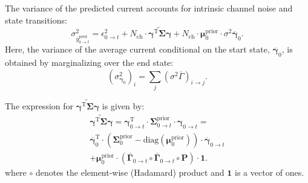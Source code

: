 \documentclass[pdflatex,sn-mathphys-num]{sn-jnl}%
\theoremstyle{thmstyleone}%
\theoremstyle{thmstyletwo}%
\theoremstyle{thmstylethree}%
\begin{document}
The variance of the predicted current accounts for intrinsic channel noise and state transitions:
\begin{equation}
	\sigma^2_{\overline{y}^{\text{pred}}_{0 \rightarrow t}} = \epsilon^2_{0 \rightarrow t} + N_{\text{ch}} \cdot \widetilde{\mathbf{\gamma}^{\mathrm{T}} \mathbf{\Sigma}\mathbf{\gamma}} + 
	N_{\text{ch}} \cdot \mathbf{\mu}^{\mathrm{prior}}_{0} \cdot {\sigma^2 \overline{\mathbf{\gamma}}}_{0}.
	\label{eq:macro_interval_sigma_pred}
\end{equation}
Here, the variance of the average current conditional on the start state, \( \overline{\mathbf{\gamma}}_{0} \), is obtained by marginalizing over the end state:
\begin{equation}
	(\sigma^2_{\overline{\mathbf{\gamma}}_{0}})_i = \sum_j (\sigma^2 \overline{\Gamma})_{i \rightarrow j}.
	\label{eq:sigma_gamma_i}
\end{equation}

The expression for \( \widetilde{\mathbf{\gamma}^{\mathrm{T}} \mathbf{\Sigma}\mathbf{\gamma}} \) is given by:
\begin{multline}
	\widetilde{\mathbf{\gamma}^{\mathrm{T}} \mathbf{\Sigma}\mathbf{\gamma}}=   \mathbf{\gamma}^{\mathrm{T}}_{0 \rightarrow t} \cdot \mathbf{\Sigma}^{\mathrm{prior}}_{0 \rightarrow t} \cdot \mathbf{\gamma}_{0 \rightarrow t} = \\
	\overline{\mathbf{\gamma}}_{0}^{\mathrm{T}} \cdot 
	\left( \mathbf{\Sigma}^{\mathrm{prior}}_{0} - \mathrm{diag}(\mathbf{\mu}^{\mathrm{prior}}_0) \right) \cdot 
	\overline{\mathbf{\gamma}}_{0 \rightarrow t} \\
	+ \mathbf{\mu}^{\mathrm{prior}}_0 \cdot \left( \overline{\mathbf{\Gamma}}_{0 \rightarrow t} \circ \overline{\mathbf{\Gamma}}_{0 \rightarrow t} \circ \mathbf{P} \right) \cdot \mathbf{1}.
	\label{eq:simplified_meta_state}
\end{multline}
where \( \circ \) denotes the element-wise (Hadamard) product and \( \mathbf{1} \) is a vector of ones.
\end{document}
